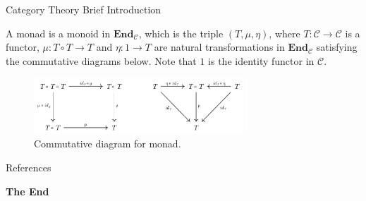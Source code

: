\documentclass[aspectratio=169,xcolor=dvipsnames,10pt]{beamer}
\theoremstyle{definition}
\begin{document}
\begin{frame}[fragile]{Category Theory Brief Introduction}
	\begin{definition}[Monad]
		A monad is a monoid in $\mathbf{End}_\mathcal C$, which is the triple $(T, \mu, \eta)$,
		where $T:\mathcal C \to \mathcal C$ is a functor,
		$\mu:T \circ T \to T$ and $\eta: 1 \to T$ are natural transformations in $\mathbf{End}_\mathcal C$ satisfying the
		commutative diagrams below. Note that $1$ is the identity functor in $\mathcal{C}$.
		\begin{figure}[H]
			\begin{center}
				\includegraphics[width=0.7\textwidth]{../notebooks/Monad.pdf}
			\end{center}
			\caption{Commutative diagram for monad.}
			\label{fig:monad}
		\end{figure}
	\end{definition}
\end{frame}


\begin{frame}{References}
    \footnotesize
    
    
\end{frame}


\begin{frame}
    \Huge{\centerline{\textbf{The End}}}
\end{frame}

\end{document}
